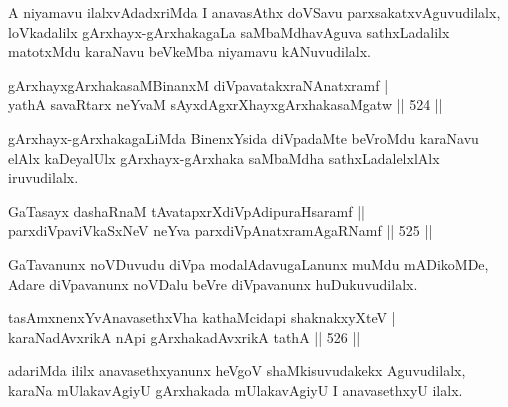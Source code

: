 \begin{artha}
A niyamavu ilalxvAdadxriMda I anavasAthx doVSavu parxsakatxvAguvudilalx, loVkadalilx gArxhayx-gArxhakagaLa saMbaMdhavAguva sathxLadalilx matotxMdu karaNavu beVkeMba niyamavu kANuvudilalx.
\end{artha}


\begin{shl}
\footnotemark[1]gArxhayxgArxhakasaMBinanxM diVpavatakxraNAnatxramf | \\
yathA savaRtarx neYvaM sAyxdAgxrXhayxgArxhakasaMgatw \hfill||  524 ||  
\end{shl}

\begin{artha}
gArxhayx-gArxhakagaLiMda BinenxYsida diVpadaMte beVroMdu karaNavu elAlx kaDeyalUlx gArxhayx-gArxhaka saMbaMdha sathxLadalelxlAlx iruvudilalx.
\end{artha}


\begin{shl}
GaTasayx dashaRnaM tAvatapxrXdiVpAdipuraHsaramf ||  \\
parxdiVpaviVkaSxNeV neYva parxdiVpAnatxramAgaRNamf \hfill ||  525 ||  
\end{shl}

\begin{artha}
GaTavanunx noVDuvudu diVpa modalAdavugaLanunx muMdu mADikoMDe, Adare diVpavanunx noVDalu beVre diVpavanunx huDukuvudilalx.
\end{artha}

\begin{shl}
tasAmxnenxYvAnavasethxVha kathaMcidapi shaknakxyXteV | \\
karaNadAvxrikA nApi gArxhakadAvxrikA tathA \hfill||  526 ||  
\end{shl}

\begin{artha}
adariMda ililx anavasethxyanunx heVgoV shaMkisuvudakekx Aguvudilalx, karaNa mUlakavAgiyU gArxhakada mUlakavAgiyU I anavasethxyU ilalx.
\end{artha}



